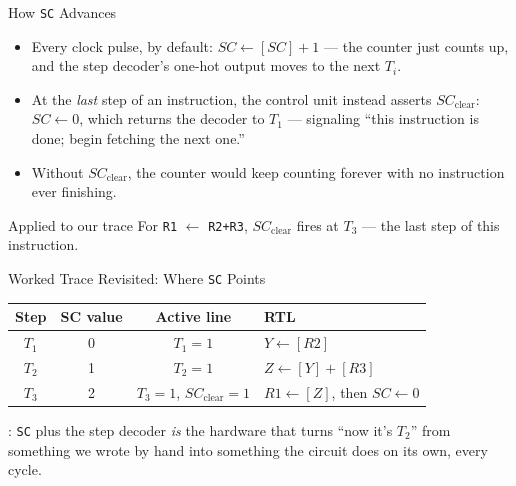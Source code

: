 \documentclass[aspectratio=169]{beamer}
\begin{document}
\begin{frame}{How \texttt{SC} Advances}
  \begin{itemize}
    \item Every clock pulse, by default: $SC \gets [SC] + 1$ --- the counter just
      counts up, and the step decoder's one-hot output moves to the next $T_i$.
    \item At the \emph{last} step of an instruction, the control unit instead
      asserts $SC_{\text{clear}}$: $SC \gets 0$, which returns the decoder to $T_1$ ---
      signaling ``this instruction is done; begin fetching the next one.''
    \item Without $SC_{\text{clear}}$, the counter would keep counting forever with no
      instruction ever finishing.
  \end{itemize}
  \begin{exampleblock}{Applied to our trace}
    For \texttt{R1} $\gets$ \texttt{R2+R3}, $SC_{\text{clear}}$ fires at $T_3$ --- the last
    step of this instruction.
  \end{exampleblock}
\end{frame}

\begin{frame}{Worked Trace Revisited: Where \texttt{SC} Points}
  \footnotesize
  \begin{tabular}{@{}cccl@{}}
    \toprule
    \textbf{Step} & \textbf{SC value} & \textbf{Active line} & \textbf{RTL} \\
    \midrule
    $T_1$ & 0 & $T_1=1$ & $Y \gets [R2]$ \\
    $T_2$ & 1 & $T_2=1$ & $Z \gets [Y] + [R3]$ \\
    $T_3$ & 2 & $T_3=1$, $SC_{\text{clear}}=1$ & $R1 \gets [Z]$, then $SC \gets 0$ \\
    \bottomrule
  \end{tabular}
  \vspace{0.3cm}
  : \texttt{SC} plus the step decoder
  \emph{is} the hardware that turns ``now it's $T_2$'' from something we wrote by
  hand into something the circuit does on its own, every cycle.
\end{frame}
\end{document}

